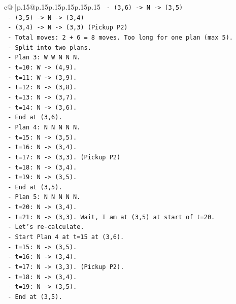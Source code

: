 \documentclass{article}
\begin{document}
{\begin{supertabular}{c@{$\;$}|p{.15\linewidth}@{}p{.15\linewidth}p{.15\linewidth}p{.15\linewidth}p{.15\linewidth}p{.15\linewidth}}
{{{\texttt{       {-} (3,6) {-}> N {-}> (3,5)} \\
\texttt{       {-} (3,5) {-}> N {-}> (3,4)} \\
\texttt{       {-} (3,4) {-}> N {-}> (3,3) (Pickup P2)} \\
\texttt{       {-} Total moves: 2 + 6 = 8 moves. Too long for one plan (max 5).} \\
\texttt{       {-} Split into two plans.} \\
\texttt{       {-} Plan 3: W W N N N.} \\
\texttt{         {-} t=10: W {-}> (4,9).} \\
\texttt{         {-} t=11: W {-}> (3,9).} \\
\texttt{         {-} t=12: N {-}> (3,8).} \\
\texttt{         {-} t=13: N {-}> (3,7).} \\
\texttt{         {-} t=14: N {-}> (3,6).} \\
\texttt{         {-} End at (3,6).} \\
\texttt{       {-} Plan 4: N N N N N.} \\
\texttt{         {-} t=15: N {-}> (3,5).} \\
\texttt{         {-} t=16: N {-}> (3,4).} \\
\texttt{         {-} t=17: N {-}> (3,3). (Pickup P2)} \\
\texttt{         {-} t=18: N {-}> (3,4).} \\
\texttt{         {-} t=19: N {-}> (3,5).} \\
\texttt{         {-} End at (3,5).} \\
\texttt{       {-} Plan 5: N N N N N.} \\
\texttt{         {-} t=20: N {-}> (3,4).} \\
\texttt{         {-} t=21: N {-}> (3,3). Wait, I am at (3,5) at start of t=20.} \\
\texttt{         {-} Let's re{-}calculate.} \\
\texttt{         {-} Start Plan 4 at t=15 at (3,6).} \\
\texttt{         {-} t=15: N {-}> (3,5).} \\
\texttt{         {-} t=16: N {-}> (3,4).} \\
\texttt{         {-} t=17: N {-}> (3,3). (Pickup P2).} \\
\texttt{         {-} t=18: N {-}> (3,4).} \\
\texttt{         {-} t=19: N {-}> (3,5).} \\
\texttt{         {-} End at (3,5).} \\
}}}
\end{supertabular}}
\end{document}
